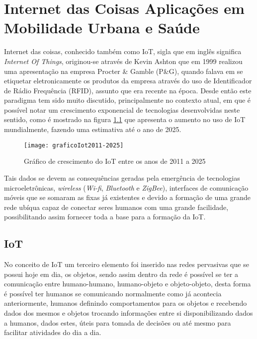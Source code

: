 \chapter{Internet das Coisas Aplicações em Mobilidade Urbana e Saúde}
\label{chap:cap1}
Internet das coisas, conhecido também como IoT, sigla que em inglês significa \textit{Internet Of Things}, originou-se através de Kevin Ashton que em 1999 realizou uma apresentação na empresa  Procter \& Gamble (P\&G), quando falava em se etiquetar eletronicamente os produtos da empresa através do uso de Identificador de Rádio Frequência (RFID), assunto que era recente na época. Desde então este paradigma tem sido muito discutido, principalmente no contexto atual, em que é possível notar um crescimento exponencial de tecnologias desenvolvidas neste sentido, como é mostrado na figura \ref{fig:graficoIot2011-2025} que apresenta o aumento no uso de IoT mundialmente, fazendo uma estimativa até o ano de 2025.\cite{historiaiot} 

\begin{figure}[htb]
\caption{\label{fig:graficoIot2011-2025}Gráfico de crescimento do IoT entre os anos de 2011 a 2025}
\begin{center}
\texttt{[image: graficoIot2011-2025]}
\end{center}
\end{figure}

Tais dados se devem as consequências geradas pela emergência de tecnologias microeletrônicas, \textit{wireless} (\textit{Wi-fi}, \textit{Bluetooth} e \textit{ZigBee}), interfaces de comunicação móveis que se somaram as fixas já existentes e devido a formação de uma grande rede ubíqua capaz de conectar seres humanos com uma grande facilidade, possibilitando assim fornecer toda a base para a formação da IoT. \cite{santaella2013} 

\section{IoT}
\label{sec:iot}
No conceito de IoT um terceiro elemento foi inserido nas redes pervasivas que se possui hoje em dia, os objetos, sendo assim dentro da rede é possível se ter a comunicação entre humano-humano, humano-objeto e objeto-objeto, desta forma é possível ter humanos se comunicando normalmente como já acontecia anteriormente, humanos definindo comportamentos para os objetos e recebendo dados dos mesmos e objetos trocando informações entre si disponibilizando dados a humanos, dados estes, úteis para tomada de decisões ou até mesmo para facilitar atividades do dia a dia.\cite{santaella2013}

